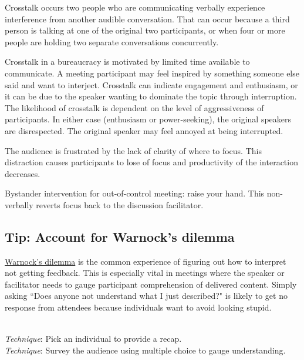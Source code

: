 Crosstalk occurs two people who are communicating verbally experience interference from another audible conversation. That can occur because a third person is talking at one of the original two participants, or when four or more people are holding two separate conversations concurrently. 

Crosstalk in a bureaucracy is motivated by
limited time available to communicate. A meeting participant may feel inspired by something someone else said and want to interject. 
Crosstalk can indicate engagement and enthusiasm, or it can be due to the speaker wanting to dominate the topic through interruption. The likelihood of crosstalk is dependent on the level of aggressiveness of participants.
In either case (enthusiasm or power-seeking), the original speakers are disrespected. The original speaker may feel annoyed at being interrupted.



The audience is frustrated by the lack of clarity of where to focus. This distraction causes participants to lose of focus and productivity of the interaction decreases.

Bystander intervention for out-of-control meeting: raise your hand.  This non-verbally reverts focus back to the discussion facilitator. 

\subsection*{Tip: Account for Warnock's dilemma}
\href{https://en.wikipedia.org/wiki/Warnock\%27s_dilemma}{Warnock's dilemma}
is the common experience of figuring out how to interpret not getting feedback. This is especially vital in meetings where the speaker or facilitator needs to gauge participant comprehension of delivered content. Simply asking ``Does anyone not understand what I just described?" is likely to get no response from attendees because individuals want to avoid looking stupid.

\ \\
\textit{Technique}: Pick an individual to provide a recap.\\
\textit{Technique}: Survey the audience using multiple choice to gauge understanding.

